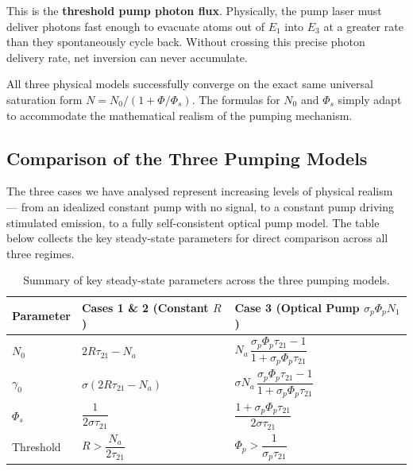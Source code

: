 This is the \textbf{threshold pump photon flux}. Physically, the pump laser must deliver photons fast enough to evacuate atoms out of $E_1$ into $E_3$ at a greater rate than they spontaneously cycle back. Without crossing this precise photon delivery rate, net inversion can never accumulate.

All three physical models successfully converge on the exact same universal saturation form $N = N_0/(1 + \Phi/\Phi_s)$. The formulas for $N_0$ and $\Phi_s$ simply adapt to accommodate the mathematical realism of the pumping mechanism.

\subsection{Comparison of the Three Pumping Models}

The three cases we have analysed represent increasing levels of physical realism — from an idealized constant pump with no signal, to a constant pump driving stimulated emission, to a fully self-consistent optical pump model. The table below collects the key steady-state parameters for direct comparison across all three regimes.

\begin{table}[H]
    \centering
    \begin{tabular}{@{} >{\raggedright\arraybackslash}p{} >{\centering\arraybackslash}p{} >{\centering\arraybackslash}p{} @{}}
        \toprule
        \textbf{Parameter} & \textbf{Cases 1 \& 2} (Constant $R$) & \textbf{Case 3} (Optical Pump $\sigma_p\Phi_p N_1$)                            \\
        \midrule
        $N_0$              & $2R\tau_{21} - N_a$                  & $N_a\,\dfrac{\sigma_p\Phi_p\tau_{21} - 1}{1 + \sigma_p\Phi_p\tau_{21}}$        \\[2ex]
        $\gamma_0$         & $\sigma(2R\tau_{21} - N_a)$          & $\sigma N_a\,\dfrac{\sigma_p\Phi_p\tau_{21} - 1}{1 + \sigma_p\Phi_p\tau_{21}}$ \\[2ex]
        $\Phi_s$           & $\dfrac{1}{2\sigma\tau_{21}}$        & $\dfrac{1 + \sigma_p\Phi_p\tau_{21}}{2\sigma\tau_{21}}$                        \\[2ex]
        Threshold          & $R > \dfrac{N_a}{2\tau_{21}}$        & $\Phi_p > \dfrac{1}{\sigma_p\tau_{21}}$                                        \\
        \bottomrule
    \end{tabular}
    \caption{Summary of key steady-state parameters across the three pumping models.}
\end{table}

